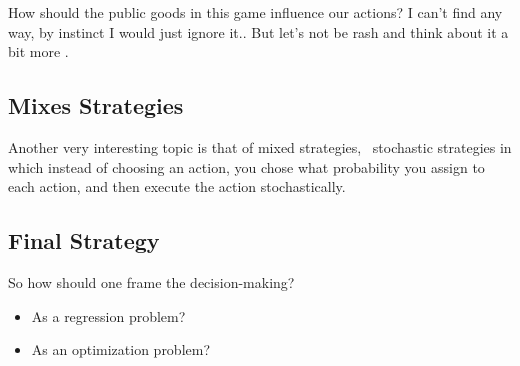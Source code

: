 \documentclass[10pt,fleqn]{article}
\begin{document}
How should the public goods in this game influence our actions? I can't find any
way, by instinct I would just ignore it.. But let's not be rash and think about
it a bit more \smiley.

\subsection{Mixes Strategies}

Another very interesting topic is that of mixed strategies, \ie\ stochastic
strategies in which instead of choosing an action, you chose what probability you
assign to each action, and then execute the action stochastically.

\subsection{Final Strategy}

So how should one frame the decision-making?
\begin{itemize}
  \item As a regression problem?
  \item As an optimization problem?
\end{itemize}
\end{document}
